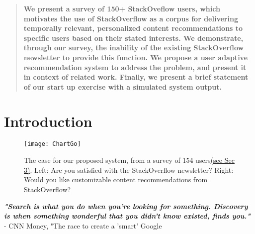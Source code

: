 \documentclass{sig-alternate-05-2015}
\begin{document}
\maketitle
\begin{abstract}
\textbf{We present a survey of 150+ StackOveflow users, which motivates the use of StackOverflow as a corpus for delivering temporally relevant, personalized content recommendations to specific users based on their stated interests. We demonstrate, through our survey, the inability of the existing StackOverflow newsletter to provide this function. We propose a user adaptive recommendation system to address the problem, and present it in context of related work. Finally, we present a brief statement of our start up exercise with a simulated system output.}
\end{abstract}


%
%





%
%

%
%



\label{key}

\section{Introduction}
\label{intro}
\vspace{0.2cm}
\begin{figure}
\centering
\texttt{[image: ChartGo]}
\caption{The case for our proposed system, from a survey of 154 users\hyperref[sec:hello]{(see Sec 3)}. Left: Are you satisfied with the StackOverflow newsletter? Right: Would you like customizable content recommendations from StackOverflow?}
\end{figure}

\textbf{\textit{"Search is what you do when you're looking for something. Discovery is when something wonderful that you didn't know existed, finds you."}}\\

- CNN Money, "The race to create a 'smart' Google\\
\end{document}
